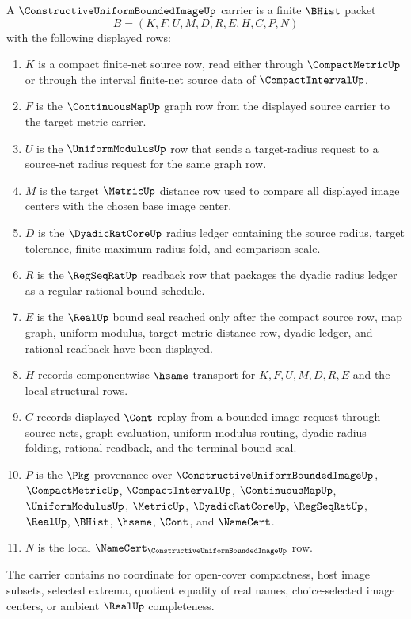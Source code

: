 \begin{definition}
\label{def:constructive-uniform-bounded-image-carrier}
A $\ConstructiveUniformBoundedImageUp$ carrier is a finite $\BHist$ packet
$$
B=(K,F,U,M,D,R,E,H,C,P,N)
$$
with the following displayed rows:
\begin{enumerate}
\item $K$ is a compact finite-net source row, read either through $\CompactMetricUp$ or through the interval finite-net source data of $\CompactIntervalUp$.
\item $F$ is the $\ContinuousMapUp$ graph row from the displayed source carrier to the target metric carrier.
\item $U$ is the $\UniformModulusUp$ row that sends a target-radius request to a source-net radius request for the same graph row.
\item $M$ is the target $\MetricUp$ distance row used to compare all displayed image centers with the chosen base image center.
\item $D$ is the $\DyadicRatCoreUp$ radius ledger containing the source radius, target tolerance, finite maximum-radius fold, and comparison scale.
\item $R$ is the $\RegSeqRatUp$ readback row that packages the dyadic radius ledger as a regular rational bound schedule.
\item $E$ is the $\RealUp$ bound seal reached only after the compact source row, map graph, uniform modulus, target metric distance row, dyadic ledger, and rational readback have been displayed.
\item $H$ records componentwise $\hsame$ transport for $K,F,U,M,D,R,E$ and the local structural rows.
\item $C$ records displayed $\Cont$ replay from a bounded-image request through source nets, graph evaluation, uniform-modulus routing, dyadic radius folding, rational readback, and the terminal bound seal.
\item $P$ is the $\Pkg$ provenance over $\ConstructiveUniformBoundedImageUp$, $\CompactMetricUp$, $\CompactIntervalUp$, $\ContinuousMapUp$, $\UniformModulusUp$, $\MetricUp$, $\DyadicRatCoreUp$, $\RegSeqRatUp$, $\RealUp$, $\BHist$, $\hsame$, $\Cont$, and $\NameCert$.
\item $N$ is the local $\NameCert_{\ConstructiveUniformBoundedImageUp}$ row.
\end{enumerate}
The carrier contains no coordinate for open-cover compactness, host image subsets, selected extrema, quotient equality of real names, choice-selected image centers, or ambient $\RealUp$ completeness.
\end{definition}

